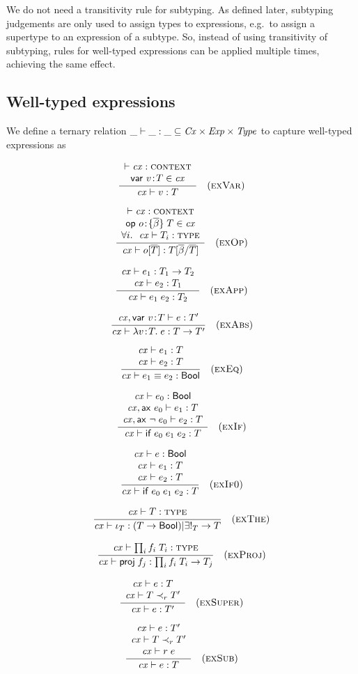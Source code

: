 We do not need a transitivity rule for subtyping. As defined later, subtyping
judgements are only used to assign types to expressions, e.g.\ to assign a
supertype to an expression of a subtype. So, instead of using transitivity of
subtyping, rules for well-typed expressions can be applied multiple times,
achieving the same effect.

\subsection{Well-typed expressions}

We define a ternary relation $\_\vdash\_:\_\subseteq\mathit{Cx}\times\mathit{Exp}\times\mathit{Type}$ to capture
well-typed expressions as

\[
\frac{\begin{array}{c}\vdash\mathit{cx}:\textsc{context}\\\mathsf{var}\ v\!:\!T\in\mathit{cx}\end{array}}{\mathit{cx}\vdash v:T}\quad\mbox{(\textsc{exVar})}
\]

\[
\frac{\begin{array}{c}\vdash\mathit{cx}:\textsc{context}\\\mathsf{op}\ o\!:\!\{\overline{\beta}\}\;T\in\mathit{cx}\\\forall i.\ \ \mathit{cx}\vdash T_i:\textsc{type}\end{array}}{\mathit{cx}\vdash o[\overline{T}]:T[\overline{\beta}/\overline{T}]}\quad\mbox{(\textsc{exOp})}
\]

\[
\frac{\begin{array}{c}\mathit{cx}\vdash e_1:T_1\to T_2\\\mathit{cx}\vdash e_2:T_1\end{array}}{\mathit{cx}\vdash e_1\;e_2:T_2}\quad\mbox{(\textsc{exApp})}
\]

\[
\frac{\begin{array}{c}\mathit{cx},\mathsf{var}\ v\!:\!T\vdash e:T'\end{array}}{\mathit{cx}\vdash\lambda v\!:\!T.\;e:T\to T'}\quad\mbox{(\textsc{exAbs})}
\]

\[
\frac{\begin{array}{c}\mathit{cx}\vdash e_1:T\\\mathit{cx}\vdash e_2:T\end{array}}{\mathit{cx}\vdash e_1\equiv e_2:\mathsf{Bool}}\quad\mbox{(\textsc{exEq})}
\]

\[
\frac{\begin{array}{c}\mathit{cx}\vdash e_0:\mathsf{Bool}\\\mathit{cx},\mathsf{ax}\ e_0\vdash e_1:T\\\mathit{cx},\mathsf{ax}\ \neg\;e_0\vdash e_2:T\end{array}}{\mathit{cx}\vdash\mathsf{if}\;e_0\;e_1\;e_2:T}\quad\mbox{(\textsc{exIf})}
\]

\[
\frac{\begin{array}{c}\mathit{cx}\vdash e:\mathsf{Bool}\\\mathit{cx}\vdash e_1:T\\\mathit{cx}\vdash e_2:T\end{array}}{\mathit{cx}\vdash\mathsf{if}\;e_0\;e_1\;e_2:T}\quad\mbox{(\textsc{exIf0})}
\]

\[
\frac{\begin{array}{c}\mathit{cx}\vdash T:\textsc{type}\end{array}}{\mathit{cx}\vdash\iota_{T}:(T\to\mathsf{Bool})|\exists!_{T}\to T}\quad\mbox{(\textsc{exThe})}
\]

\[
\frac{\begin{array}{c}\mathit{cx}\vdash\prod_{i}f_i\;T_i:\textsc{type}\end{array}}{\mathit{cx}\vdash\mathsf{proj}\;{f_j}:\prod_{i}f_i\;T_i\to T_j}\quad\mbox{(\textsc{exProj})}
\]



\[
\frac{\begin{array}{c}\mathit{cx}\vdash e:T\\\mathit{cx}\vdash T\prec_{r}T'\end{array}}{\mathit{cx}\vdash e:T'}\quad\mbox{(\textsc{exSuper})}
\]

\[
\frac{\begin{array}{c}\mathit{cx}\vdash e:T'\\\mathit{cx}\vdash T\prec_{r}T'\\\mathit{cx}\vdash r\;e\end{array}}{\mathit{cx}\vdash e:T}\quad\mbox{(\textsc{exSub})}
\]

